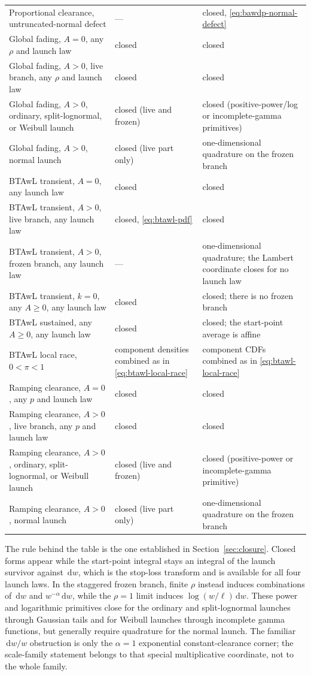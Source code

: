 \documentclass[12pt]{article}
\newcommand{\dd}{\,\mathrm{d}}
\theoremstyle{remark}
\begin{document}
\begin{center}
\begin{tabular}{p{}p{}p{}}
Proportional clearance, untruncated-normal defect &
--- & closed, \eqref{eq:bawdp-normal-defect} \\
Global fading, $A = 0$, any $\rho$ and launch law & closed & closed \\
Global fading, $A > 0$, live branch, any $\rho$ and launch law &
closed & closed \\
Global fading, $A > 0$, ordinary, split-lognormal, or Weibull launch &
closed (live and frozen) & closed (positive-power/log or incomplete-gamma primitives) \\
Global fading, $A > 0$, normal launch &
closed (live part only) & one-dimensional quadrature on the frozen branch \\
BTAwL transient, $A = 0$, any launch law & closed & closed \\
BTAwL transient, $A > 0$, live branch, any launch law &
closed, \eqref{eq:btawl-pdf} & closed \\
BTAwL transient, $A > 0$, frozen branch, any launch law &
--- & one-dimensional quadrature; the Lambert coordinate closes for no
launch law \\
BTAwL transient, $k = 0$, any $A \ge 0$, any launch law &
closed & closed; there is no frozen branch \\
BTAwL sustained, any $A \ge 0$, any launch law &
closed & closed; the start-point average is affine \\
BTAwL local race, $0<\pi<1$ &
component densities combined as in \eqref{eq:btawl-local-race} &
component CDFs combined as in \eqref{eq:btawl-local-race} \\
Ramping clearance, $A = 0$, any $p$ and launch law & closed & closed \\
Ramping clearance, $A > 0$, live branch, any $p$ and launch law &
closed & closed \\
Ramping clearance, $A > 0$, ordinary, split-lognormal, or Weibull launch &
closed (live and frozen) & closed (positive-power or incomplete-gamma primitive) \\
Ramping clearance, $A > 0$, normal launch &
closed (live part only) & one-dimensional quadrature on the frozen branch \\
\bottomrule
\end{tabular}
\end{center}

The rule behind the table is the one established in Section~\ref{sec:closure}. Closed forms appear while the start-point integral stays an integral of the launch survivor against $\dd w$, which is the stop-loss transform and is available for all four launch laws. In the staggered frozen branch, finite $\rho$ instead induces combinations of $\dd w$ and $w^{-\alpha}\dd w$, while the $\rho=1$ limit induces $\log(w/\ell)\dd w$. These power and logarithmic primitives close for the ordinary and split-lognormal launches through Gaussian tails and for Weibull launches through incomplete gamma functions, but generally require quadrature for the normal launch. The familiar $\dd w/w$ obstruction is only the $\alpha=1$ exponential constant-clearance corner; the scale-family statement belongs to that special multiplicative coordinate, not to the whole family.
\end{document}
